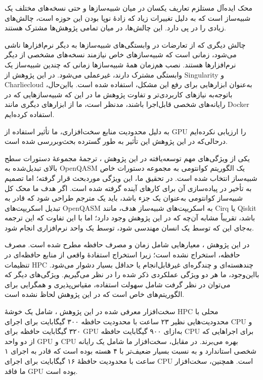 محک ایده‌آل مستلزم تعاریف یکسان در میان شبیه‌سازها و حتی نسخه‌های مختلف یک شبیه‌ساز است که به دلیل تغییرات زیاد که زادهٔ نوپا بودن این حوزه است، چالش‌های زیادی را در پی دارد. این چالش‌ها، در میان تمامی پژوهش‌ها مشترک هستند.

چالش دیگری که از تعارضات در وابستگی‌های شبیه‌سازها به دیگر نرم‌افزارها ناشی می‌شود، زمانی است که شبیه‌سازهای خاص نیازمند نسخه‌های مشخصی از دیگر نرم‌افزارها هستند. نصب هم‌زمان همهٔ شبیه‌سازها زمانی که چندین شبیه‌ساز یک وابستگی مشترک دارند، غیرعملی می‌شود. در این پژوهش
\cite{jamadagni_benchmarking_2024}
از Singularity و ‌Charliecloud به‌عنوان ابزارهایی برای رفع این مشکل، استفاده شده است. بااین‌حال، باتوجه‌به نیازهای کاربردی‌تر و تفاوت پژوهش ما در این که شبیه‌سازهایی که در رایانه‌های شخصی قابل‌اجرا باشند، مدنظر است، ما از ابزارهای دیگری مانند Docker استفاده کرده‌ایم.

به دلیل محدودیت منابع سخت‌افزاری، ما تأثیر استفاده از GPU را ارزیابی نکرده‌ایم درحالی‌که در این پژوهش
\cite{jamadagni_benchmarking_2024}
این تأثیر به طور گسترده بحث‌وبررسی شده است.

یکی از ویژگی‌های مهم توسعه‌یافته در این پژوهش
\cite{jamadagni_benchmarking_2024}،
ترجمهٔ مجموعهٔ دستورات سطح بالای تبدیل‌شده به OpenQASM یک الگوریتم کوانتومی به مجموعه دستورات خاص شبیه‌ساز انتخاب شده است. در تحقیق ما، این ویژگی موردبحث قرار گرفته؛ اما تصمیم به تأخیر در پیاده‌سازی آن برای کارهای آینده گرفته شده است. اگر هدف ما محک کل شبیه‌ساز کوانتومی به‌عنوان یک جزء باشد، باید یک مترجم طراحی شود که قادر به تبدیل اسکریپت‌های OpenQASM به اسکریپت‌های شبیه‌ساز هدف، مانند Cirq یا Qiskit باشد، تقریباً مشابه آن‌چه که در این پژوهش
\cite{jamadagni_benchmarking_2024}
 وجود دارد؛ اما با این تفاوت که این ترجمه به‌جای این که توسط یک انسان مهندسی شود، توسط یک واحد نرم‌افزاری انجام شود.

در این پژوهش
\cite{jamadagni_benchmarking_2024}،
معیارهایی شامل زمان و مصرف حافظه مطرح شده است. مصرف حافظه، استخراج نشده است؛ زیرا استخراج استفادهٔ واقعی از منابع حافظه‌ای در تنظیمات HPC چندهسته‌ای و چندگره‌ای غیرقابل‌انجام یا حداقل بسیار دشوار می‌شود. بااین‌وجود، ما هر دو ویژگی عملکردی ذکر شده را در نظر می‌گیریم. ویژگی‌های دیگر که می‌توان در نظر گرفت شامل سهولت استفاده، مقیاس‌پذیری و همگرایی برای الگوریتم‌های خاص است که در این پژوهش
\cite{jamadagni_benchmarking_2024}
لحاظ نشده است.

سخت‌افزار معرفی شده در این پژوهش
\cite{jamadagni_benchmarking_2024}،
شامل یک خوشهٔ HPC محلی با محدودیت‌هایی نظیر ۲۳ ساعت با محدودیت حافظه ۳۰۰ گیگابایت برای اجرای CPU و ۳۲۰ گیگابایت حافظه برای GPU به‌ازای ۹۰۰ گیگابایت حافظه CPU برای اجراهایی که از دو واحد GPU و CPU بهره می‌برند. در مقابل، سخت‌افزار ما شامل یک رایانه شخصی استاندارد و به نسبت بسیار ضعیف‌تر با ۴ هسته بوده است که قادر به اجرای ۱ ساعت با محدودیت حافظهٔ ۱۶ گیگابایت برای اجرای CPU است. همچنین، سخت‌افزار ما فاقد GPU بوده است.

